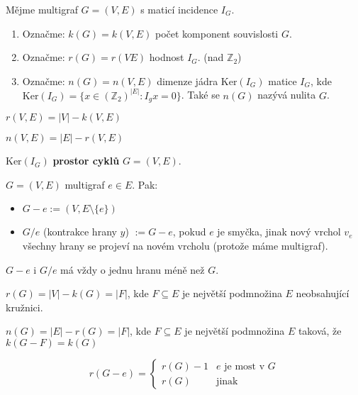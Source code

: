 \begin{definice}
	Mějme multigraf $G = (V,E)$ s maticí incidence $I_{G}$.
	
	\begin{enumerate}
		\item Označme: $k(G) = k(V,E)$ počet komponent souvislosti $G$.
		\item Označme: $r(G) = r(VE)$ hodnost $I_{G}$. (nad $\mathbb{Z}_{2}$)
		\item Označme: $n(G) = n(V,E)$ dimenze jádra $\text{Ker}(I_{G})$ matice $I_{G}$, kde $\text{Ker}(I_{G}) = \{x \in (\mathbb{Z}_{2})^{|E|}: I_{g}x = 0\}$. Také se $n(G)$ nazývá nulita $G$.
	\end{enumerate}
\end{definice}

\begin{pozor}
	$r(V,E) = |V| - k(V,E)$
\end{pozor}

\begin{pozor}
	$n(V,E) = |E| - r(V,E)$
\end{pozor}

\begin{definice}
	$\text{Ker}(I_{G})$ \textbf{prostor cyklů} $G= (V,E)$.
\end{definice}

\begin{definice}
	$G = (V,E)$ multigraf $e \in E$. Pak:
	
	\begin{itemize}
		\item $G-e := (V, E \setminus \{e\})$
		\item $G / e$ (kontrakce hrany $y$) $:= G - e$, pokud $e$ je smyčka, jinak nový vrchol $v_{e}$ všechny hrany se projeví na novém vrcholu (protože máme multigraf).
	\end{itemize}
\end{definice}

\begin{pozor}
	$G-e$ i $G/e$ má vždy o jednu hranu méně než $G$.
\end{pozor}


$r(G) = |V| - k(G) = |F|$, kde $F \subseteq E$ je největší podmnožina $E$ neobsahující kružnici.

$n(G) = |E| - r(G) = |F|$, kde $F \subseteq E$ je největší podmnožina $E$ taková, že $k(G-F) = k(G)$

$$
r(G-e) = 
\left\{
\begin{array}{ll}
	r(G)-1 & e \text{ je most v } G \\
	r(G) & \text{jinak}
\end{array}
\right.
$$


